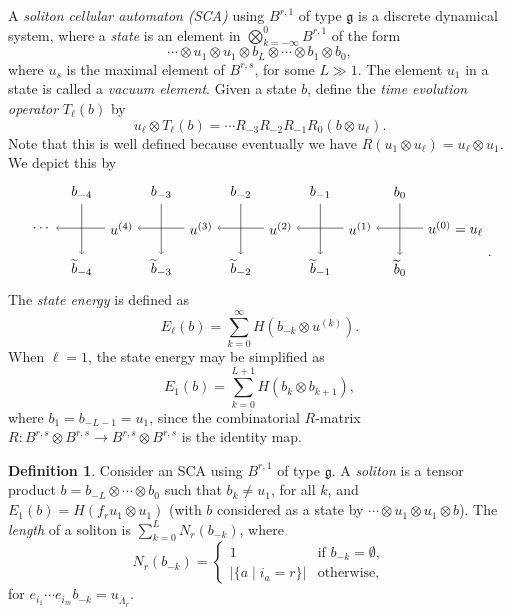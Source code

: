 \documentclass[reqno]{amsart}
\newcommand{\g}{\mathfrak{g}}
\newcommand{\clfw}{\overline{\Lambda}} %
\newcommand{\defn}[1]{{\color{darkred}\emph{#1}}} %
\theoremstyle{plain}
\theoremstyle{definition}
\newtheorem{dfn}[thm]{Definition}
\numberwithin{equation}{section}
\begin{document}
A \defn{soliton cellular automaton (SCA)} using $B^{r,1}$ of type $\g$ is a discrete dynamical system, where a \defn{state} is an element in $\bigotimes_{k=-\infty}^{0} B^{r,1}$ of the form
\[
\cdots \otimes u_1 \otimes u_1 \otimes b_L \otimes \cdots \otimes b_1 \otimes b_0,
\]
where $u_s$ is the maximal element of $B^{r,s}$, for some $L \gg 1$.
The element $u_1$ in a state is called a \defn{vacuum element}.
Given a state $b$, define the \defn{time evolution operator} $T_{\ell}(b)$ by
\[
u_{\ell} \otimes T_{\ell}(b) = \cdots R_{-3} R_{-2} R_{-1} R_0(b \otimes u_{\ell}).
\]
Note that this is well defined because eventually we have $R(u_1 \otimes u_{\ell}) = u_{\ell} \otimes u_1$.
We depict this by
\[
\begin{tikzpicture}[baseline=-20]
\node (u0) at (0.4,0) {$u^{(0)} = u_{\ell}$};
\foreach \x in {-4, ..., 0} {
    \node (b\x) at (2*\x-1,0.9) {$b_{\x}$};
    \node (bt\x) at (2*\x-1,-1) {$\widetilde{b}_{\x}$};
    \draw[->] (b\x) -- (bt\x);
}
\foreach \x [evaluate=\x as \xm using {int(\x-1)}] in {1, ..., 4} {
    \node (u\x) at (-2*\x, 0) {$u^{(\x)}$};
    \draw[->] (u\xm) -- (u\x);
}
\node (u5) at (-10, 0) {$\cdots$};
\draw[->] (u4) -- (u5);
\end{tikzpicture}.
\]
The \defn{state energy} is defined as
\[
E_{\ell}(b) = \sum_{k=0}^{\infty} H(b_{-k} \otimes u^{(k)}).
\]
When $\ell = 1$, the state energy may be simplified as
\[
E_1(b) = \sum_{k=0}^{L+1} H(b_k \otimes b_{k+1}),
\]
where $b_1 = b_{-L-1} = u_1$, since the combinatorial $R$-matrix $R \colon B^{r,s} \otimes B^{r,s} \to B^{r,s} \otimes B^{r,s}$ is the identity map.

\begin{dfn}
\label{def:soliton}
Consider an SCA using $B^{r,1}$ of type $\g$.
A \defn{soliton} is a tensor product $b = b_{-L} \otimes \cdots \otimes b_0$ such that $b_k \neq u_1$, for all $k$, and $E_1(b) = H(f_r u_1 \otimes u_1)$ (with $b$ considered as a state by $\cdots \otimes u_1 \otimes u_1 \otimes b$).
The \defn{length} of a soliton is $\sum_{k=0}^L N_r(b_{-k})$, where
\[
N_r(b_{-k}) = \begin{cases}
1 & \text{if } b_{-k} = \emptyset, \\
\lvert \{a \mid i_a = r \} \rvert & \text{otherwise},
\end{cases}
\]
for $e_{i_1} \dotsm e_{i_m} b_{-k} = u_{\clfw_r}$.
\end{dfn}
\end{document}
